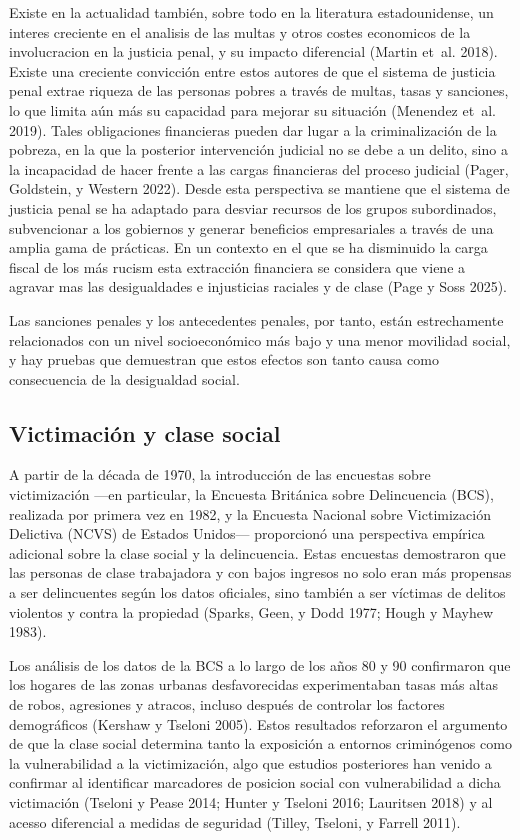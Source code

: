 \documentclass[
  spanish,
  letterpaper,
  DIV=11,
  numbers=noendperiod]{scrreprt}
\begin{document}
Existe en la actualidad también, sobre todo en la literatura
estadounidense, un interes creciente en el analisis de las multas y
otros costes economicos de la involucracion en la justicia penal, y su
impacto diferencial (Martin et~al. 2018). Existe una creciente
convicción entre estos autores de que el sistema de justicia penal
extrae riqueza de las personas pobres a través de multas, tasas y
sanciones, lo que limita aún más su capacidad para mejorar su situación
(Menendez et~al. 2019). Tales obligaciones financieras pueden dar lugar
a la criminalización de la pobreza, en la que la posterior intervención
judicial no se debe a un delito, sino a la incapacidad de hacer frente a
las cargas financieras del proceso judicial (Pager, Goldstein, y Western
2022). Desde esta perspectiva se mantiene que el sistema de justicia
penal se ha adaptado para desviar recursos de los grupos subordinados,
subvencionar a los gobiernos y generar beneficios empresariales a través
de una amplia gama de prácticas. En un contexto en el que se ha
disminuido la carga fiscal de los más rucism esta extracción financiera
se considera que viene a agravar mas las desigualdades e injusticias
raciales y de clase (Page y Soss 2025).

Las sanciones penales y los antecedentes penales, por tanto, están
estrechamente relacionados con un nivel socioeconómico más bajo y una
menor movilidad social, y hay pruebas que demuestran que estos efectos
son tanto causa como consecuencia de la desigualdad social.

\subsection{Victimación y clase
social}\label{victimaciuxf3n-y-clase-social}

A partir de la década de 1970, la introducción de las encuestas sobre
victimización ---en particular, la Encuesta Británica sobre Delincuencia
(BCS), realizada por primera vez en 1982, y la Encuesta Nacional sobre
Victimización Delictiva (NCVS) de Estados Unidos--- proporcionó una
perspectiva empírica adicional sobre la clase social y la delincuencia.
Estas encuestas demostraron que las personas de clase trabajadora y con
bajos ingresos no solo eran más propensas a ser delincuentes según los
datos oficiales, sino también a ser víctimas de delitos violentos y
contra la propiedad (Sparks, Geen, y Dodd 1977; Hough y Mayhew 1983).

Los análisis de los datos de la BCS a lo largo de los años 80 y 90
confirmaron que los hogares de las zonas urbanas desfavorecidas
experimentaban tasas más altas de robos, agresiones y atracos, incluso
después de controlar los factores demográficos (Kershaw y Tseloni 2005).
Estos resultados reforzaron el argumento de que la clase social
determina tanto la exposición a entornos criminógenos como la
vulnerabilidad a la victimización, algo que estudios posteriores han
venido a confirmar al identificar marcadores de posicion social con
vulnerabilidad a dicha victimación (Tseloni y Pease 2014; Hunter y
Tseloni 2016; Lauritsen 2018) y al acesso diferencial a medidas de
seguridad (Tilley, Tseloni, y Farrell 2011).
\end{document}
